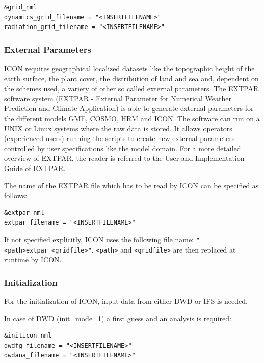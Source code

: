 \begin{verbatim}
&grid_nml
dynamics_grid_filename = "<INSERTFILENAME>"
radiation_grid_filename = "<INSERTFILENAME>"
\end{verbatim}

\subsubsection{External Parameters}\label{InputReal:Ext}

ICON requires geographical localized datasets like the topographic height of the earth surface, the plant cover, the distribution of land and sea and, dependent on the schemes used, a variety of other so called external parameters. The EXTPAR software system (EXTPAR - External Parameter for Numerical Weather Prediction and Climate Application) is able to generate external parameters for the different models GME, COSMO, HRM and ICON. The software can run on a UNIX or Linux systems where the raw data is stored. It allows operators (experienced users) running the scripts to create new external parameters controlled by user specifications like the model domain. For a more detailed overview of EXTPAR, the reader is referred to the User and Implementation Guide of EXTPAR. 

The name of the EXTPAR file which has to be read by ICON can be specified as follows:

\begin{verbatim}
&extpar_nml
extpar_filename = "<INSERTFILENAME>"
\end{verbatim}

If not specified explicitly, ICON uses the following file name: \newline
\verb+"<path>extpar_<gridfile>"+.\newline
 \verb+<path>+ and \verb+<gridfile>+ are then replaced at runtime by ICON.

\subsubsection{Initialization}\label{InputReal:Ini}

For the initialization of ICON, input data from either DWD or IFS is needed. 

In case of DWD (init\_mode=1) a first guess and an analysis is required: 
\begin{verbatim}
&initicon_nml
dwdfg_filename = "<INSERTFILENAME>"
dwdana_filename = "<INSERTFILENAME>"
\end{verbatim}

